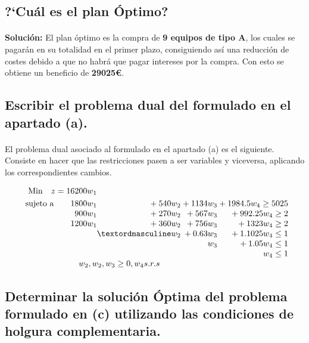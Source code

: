 \documentclass[10pt, a4paper]{article}
\begin{document}
		\subsection{?`Cuál es el plan Óptimo?}

			\paragraph{}
			\textbf{Solución:} El plan óptimo es la compra de \textbf{9 equipos de tipo A}, los cuales se pagarán en su totalidad en el primer plazo, consiguiendo así una reducción de costes debido a que no habrá que pagar intereses por la compra. Con esto se obtiene un beneficio de \textbf{29025\euro}.

		\subsection{Escribir el problema dual del formulado en el apartado (a).}

			\paragraph{}
			El problema dual asociado al formulado en el apartado (a) es el siguiente. Consiste en hacer que las restricciones pasen a ser variables y viceversa, aplicando los correspondientes cambios.

			\[
			  \begin{array}{r@{}r@{}r@{}r@{}l}
			    \text{Min} \quad z = 16200w_{1} \\[\jot]
			    \text{sujeto a}\qquad 	1800w_{1} 	&{}+540w_{2}&{}	+1134w_{3} 		&{} +1984.5w_{4} 	\geq 5025 \\
			                     		900w_{1} 	&{}+270w_{2}&{}	+567w_{3} 		&{} +992.25w_{4}	\geq 2 \\
								 		1200w_{1} 	&{}+360w_{2}&{} +756w_{3}		&{} +1323w_{4}		\geq 2 \\
								 		  			&{}º   w_{2}&{} +0.63w_{3}		&{} +1.1025w_{4}	\leq 1  \\
								 		  			&{} 		&{} 	w_{3}		&{} +1.05w_{4}		\leq 1 \\
										    		&{} 		&{} 				&{} w_{4} 			\leq 1 \\
			     \multicolumn{3}{c}{ w_{2},w_{2},w_{3} \geq 0,  w_{4} s.r.s}
			  \end{array}
			\]


		\subsection{Determinar la solución Óptima del problema formulado en (c) utilizando las condiciones de holgura complementaria.}
\end{document}

